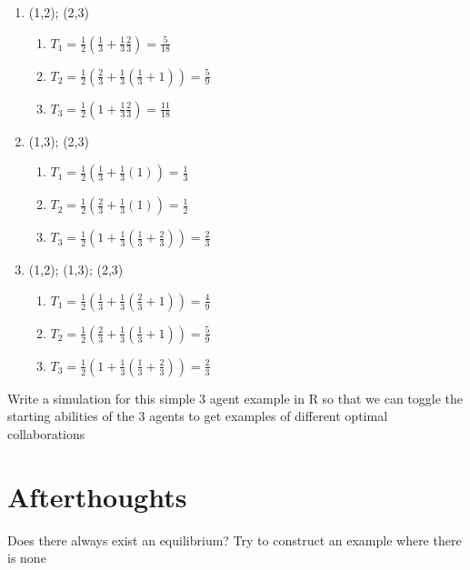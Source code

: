 \documentclass[11pt]{article}
\theoremstyle{quest}
\begin{document}
\begin{enumerate}
\begin{enumerate}
        \item (1,2); (2,3)
        \begin{enumerate}
            \item $T_1 = \frac{1}{2}(\frac{1}{3}+\frac{1}{3}\frac{2}{3}) = \frac{5}{18}$
            \item $T_2 = \frac{1}{2}(\frac{2}{3}+\frac{1}{3}(\frac{1}{3}+1)) = \frac{5}{9}$
            \item $T_3 = \frac{1}{2}(1+\frac{1}{3}\frac{2}{3}) = \frac{11}{18}$
        \end{enumerate}
        \item (1,3); (2,3)
        \begin{enumerate}
            \item $T_1 = \frac{1}{2}(\frac{1}{3}+\frac{1}{3}(1)) = \frac{1}{3}$
            \item $T_2 = \frac{1}{2}(\frac{2}{3}+\frac{1}{3}(1)) = \frac{1}{2}$
            \item $T_3 = \frac{1}{2}(1+\frac{1}{3}(\frac{1}{3}+\frac{2}{3})) = \frac{2}{3}$
        \end{enumerate}
        \item (1,2); (1,3); (2,3)
        \begin{enumerate}
            \item $T_1 = \frac{1}{2}(\frac{1}{3}+\frac{1}{3}(\frac{2}{3}+1)) = \frac{4}{9}$
            \item $T_2 = \frac{1}{2}(\frac{2}{3}+\frac{1}{3}(\frac{1}{3}+1)) = \frac{5}{9}$
            \item $T_3 = \frac{1}{2}(1+\frac{1}{3}(\frac{1}{3}+\frac{2}{3})) = \frac{2}{3}$
        \end{enumerate}
    \end{enumerate}

Write a simulation for this simple 3 agent example in R so that we can toggle the starting abilities of the 3 agents to get examples of different optimal collaborations

\section{Afterthoughts}
    Does there always exist an equilibrium? Try to construct an example where there is none

\end{enumerate}
\end{document}
